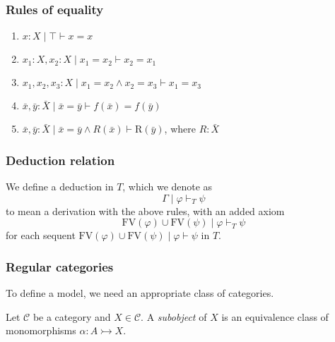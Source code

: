 \documentclass[14pt]{beamer}
\theoremstyle{plain}
\begin{document}
  \begin{frame}
    \frametitle{Rules of equality}
    
    \begin{enumerate}\addtolength{\itemsep}{0.7\baselineskip}
    \item $x:X \mid \top \vdash x = x$
    \item
      $x_1:X,x_2:X \mid x_1 = x_2 \vdash x_2 = x_1$
    \item
      $x_1,x_2,x_3:X \mid x_1 = x_2 \wedge x_2 = x_3 \vdash x_1 = x_3$
    \item
      $\bar{x},\bar{y}:\bar{X} \mid \bar{x} = \bar{y} \vdash
      f(\bar{x}) = f(\bar{y})$
    \item
      $\bar{x},\bar{y} : \bar{X} \mid \bar{x} = \bar{y} \wedge R(\bar{x}) \vdash
      \mathrm{R}(\bar{y})$, where
      $R : \bar{X}$
    \end{enumerate}

  \end{frame}

  \begin{frame}
    \frametitle{Deduction relation}
    We define a deduction in $T$, which we denote as 
    \[\Gamma \mid \varphi \vdash_T \psi\]
    \pause
    to mean a derivation with the above rules, with an added axiom
    \[  \mathrm{FV}(\varphi) \cup \mathrm{FV}(\psi) \mid \varphi \vdash_T \psi \]
    for each sequent $\mathrm{FV}(\varphi) \cup \mathrm{FV}(\psi)  \mid \varphi \vdash \psi$ in $T$.
  \end{frame}

  \begin{frame}[fragile]
    \frametitle{Regular categories}
    To define a model, we need an appropriate class of categories.
    \pause
    \begin{definition}
      Let $\mathcal{C}$ be a category and $X \in \mathcal{C}$.
      A \emph{subobject} of $X$ is an equivalence class of monomorphisms
      $\alpha : A \rightarrowtail X$. 
      \pause
      
      \begin{center}
      \end{center}
    \end{definition}
  \end{frame}
\end{document}
